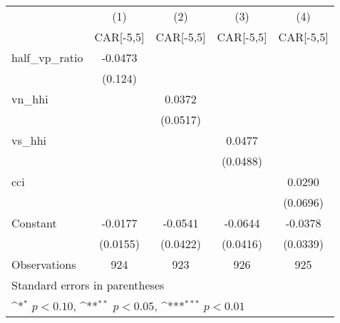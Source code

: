 {
\def\sym#1{\ifmmode^{#1}\else\(^{#1}\)\fi}
\begin{tabular}{l*{4}{c}}
\hline\hline
                    &\multicolumn{1}{c}{(1)}&\multicolumn{1}{c}{(2)}&\multicolumn{1}{c}{(3)}&\multicolumn{1}{c}{(4)}\\
                    &\multicolumn{1}{c}{CAR[-5,5]}&\multicolumn{1}{c}{CAR[-5,5]}&\multicolumn{1}{c}{CAR[-5,5]}&\multicolumn{1}{c}{CAR[-5,5]}\\
\hline
half\_vp\_ratio       &     -0.0473         &                     &                     &                     \\
                    &     (0.124)         &                     &                     &                     \\
[1em]
vn\_hhi              &                     &      0.0372         &                     &                     \\
                    &                     &    (0.0517)         &                     &                     \\
[1em]
vs\_hhi              &                     &                     &      0.0477         &                     \\
                    &                     &                     &    (0.0488)         &                     \\
[1em]
cci                 &                     &                     &                     &      0.0290         \\
                    &                     &                     &                     &    (0.0696)         \\
[1em]
Constant            &     -0.0177         &     -0.0541         &     -0.0644         &     -0.0378         \\
                    &    (0.0155)         &    (0.0422)         &    (0.0416)         &    (0.0339)         \\
\hline
Observations        &         924         &         923         &         926         &         925         \\
\hline\hline
\multicolumn{5}{l}{\footnotesize Standard errors in parentheses}\\
\multicolumn{5}{l}{\footnotesize \sym{*} \(p<0.10\), \sym{**} \(p<0.05\), \sym{***} \(p<0.01\)}\\
\end{tabular}
}
